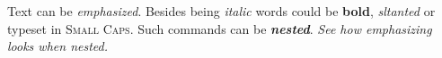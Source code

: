 \documentclass{article}
\begin{document}
	{\sffamily
	Text can be {\em emphasized}.
	Besides being {\itshape italic} words could be {\bfseries bold},
	{\slshape sltanted} or typeset in {\scshape Small Caps}.
	Such commands can be {\itshape\bfseries nested}.}
	{\em See how {\em emphasizing} looks when nested.}
\end{document}
